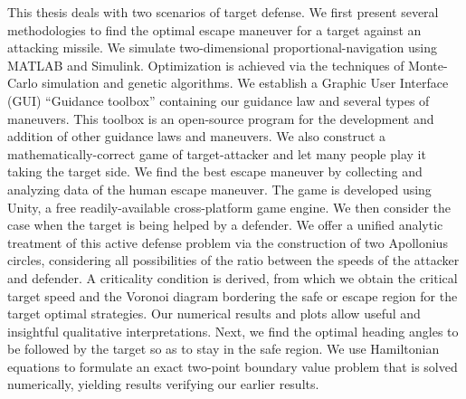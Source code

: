 This thesis deals with two scenarios of target defense. We first present several methodologies to find the optimal escape maneuver for a target against an attacking missile. We simulate two-dimensional proportional-navigation using MATLAB and Simulink. Optimization is achieved via the techniques of Monte-Carlo simulation and genetic algorithms. We establish a Graphic User Interface (GUI) “Guidance toolbox” containing our guidance law and several types of maneuvers. This toolbox is an open-source program for the development and addition of other guidance laws and maneuvers. We also construct a mathematically-correct game of target-attacker and let many people play it taking the target side. We find the best escape maneuver by collecting and analyzing data of the human escape maneuver. The game is developed using Unity, a free readily-available cross-platform game engine. We then consider the case when the target is being helped by a defender. We offer a unified analytic treatment of this active defense problem via the construction of two Apollonius circles, considering all possibilities of the ratio between the speeds of the attacker and defender. A criticality condition is derived, from which we obtain the critical target speed and the Voronoi diagram bordering the safe or escape region for the target optimal strategies. Our numerical results and plots allow useful and insightful qualitative interpretations. Next, we find the optimal heading angles to be followed by the target so as to stay in the safe region. We use Hamiltonian equations to formulate an exact two-point boundary value problem that is solved numerically, yielding results verifying our earlier results.  